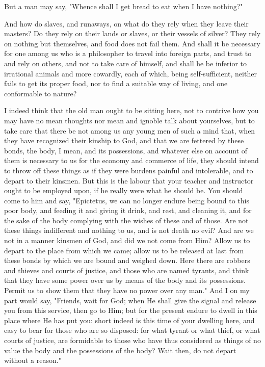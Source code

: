 \documentclass[a4paper]{article}
\begin{document}
But a man may say, "Whence shall I get bread to eat when I have nothing?"

And how do slaves, and runaways, on what do they rely when they leave
their masters? Do they rely on their lands or slaves, or their vessels
of silver? They rely on nothing but themselves, and food does not
fail them. And shall it be necessary for one among us who is a philosopher
to travel into foreign parts, and trust to and rely on others, and
not to take care of himself, and shall he be inferior to irrational
animals and more cowardly, each of which, being self-sufficient, neither
fails to get its proper food, nor to find a suitable way of living,
and one conformable to nature? 

I indeed think that the old man ought to be sitting here, not to contrive
how you may have no mean thoughts nor mean and ignoble talk about
yourselves, but to take care that there be not among us any young
men of such a mind that, when they have recognized their kinship to
God, and that we are fettered by these bonds, the body, I mean, and
its possessions, and whatever else on account of them is necessary
to us for the economy and commerce of life, they should intend to
throw off these things as if they were burdens painful and intolerable,
and to depart to their kinsmen. But this is the labour that your teacher
and instructor ought to be employed upon, if he really were what he
should be. You should come to him and say, "Epictetus, we can no longer
endure being bound to this poor body, and feeding it and giving it
drink, and rest, and cleaning it, and for the sake of the body complying
with the wishes of these and of those. Are not these things indifferent
and nothing to us, and is not death no evil? And are we not in a manner
kinsmen of God, and did we not come from Him? Allow us to depart to
the place from which we came; allow us to be released at last from
these bonds by which we are bound and weighed down. Here there are
robbers and thieves and courts of justice, and those who are named
tyrants, and think that they have some power over us by means of the
body and its possessions. Permit us to show them that they have no
power over any man." And I on my part would say, "Friends, wait for
God; when He shall give the signal and release you from this service,
then go to Him; but for the present endure to dwell in this place
where He has put you: short indeed is this time of your dwelling here,
and easy to bear for those who are so disposed: for what tyrant or
what thief, or what courts of justice, are formidable to those who
have thus considered as things of no value the body and the possessions
of the body? Wait then, do not depart without a reason."
\end{document}
